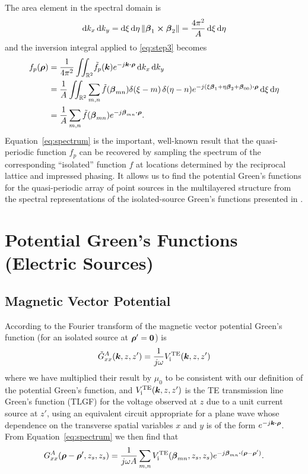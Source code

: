 The area element in the spectral domain is 
\begin{equation}
  \text{d} k_x \, \text{d} k_y = \text{d} \xi \, \text{d} \eta \left\lVert\boldsymbol{\beta}_1 \boldsymbol{\times}
  \boldsymbol{\beta}_2\right\rVert = \frac{4\pi^2}{A} \, \text{d} \xi \, \text{d} \eta
\end{equation}
and the inversion integral applied to \eqref{eq:step3} becomes
\begin{align}
  f_p(\boldsymbol{\rho}) 
  &= \frac{1}{4\pi^2} \iint_{\mathbb{R}^2} \! \tilde{f}_p(\boldsymbol{k}) e^{-j\boldsymbol{k} \boldsymbol{\cdot}
    \boldsymbol{\rho}} \,  \text{d} k_x \, \text{d} k_y \nonumber \\
  &= \frac{1}{A} \iint_{\mathbb{R}^2}
  \sum_{m,n} 
  \tilde{f}(\boldsymbol{\beta}_{mn})  
  \delta(\xi - m) \, \delta(\eta-n)
  e^{-j(\xi\boldsymbol{\beta}_1 + \eta\boldsymbol{\beta}_2 + \boldsymbol{\beta}_{00}) 
    \boldsymbol{\cdot} \boldsymbol{\rho}} \, \text{d} \xi \, \text{d} \eta \nonumber \\
  &= \frac{1}{A}   \sum_{m,n} 
  \tilde{f}(\boldsymbol{\beta}_{mn})  e^{-j\boldsymbol{\beta}_{mn} \boldsymbol{\cdot} \boldsymbol{\rho}}.
  \label{eq:spectrum}
\end{align}
Equation~\eqref{eq:spectrum} is the important, well-known result that the
quasi-periodic function $f_p$ can be recovered by sampling the spectrum of
the corresponding ``isolated'' function $f$ at locations determined by
the reciprocal lattice and impressed phasing. It allows us to
find the potential Green's functions for the quasi-periodic array of
point sources in the multilayered structure
from the spectral representations of the isolated-source Green's functions
presented in \cite{mimo:97}. 

\section{Potential Green's Functions (Electric Sources)}

\subsection{Magnetic Vector Potential}
According to \cite{mimo:97} the Fourier transform of the magnetic
vector potential Green's function (for an isolated source at $\boldsymbol{\rho}'
= \boldsymbol{0}$) is
\begin{equation}
  \label{GA}
  \tilde{G}^{A}_{xx}(\boldsymbol{k},z,z') = \frac{1}{j\omega}V_{\text{i}}^{\text{TE}}(\boldsymbol{k},z,z')
\end{equation}
where we have multiplied their result by $\mu_0$ to be consistent with
our definition of the potential Green's function, and $V_{\text{i}}^{\text{TE}}(\boldsymbol{k},z,z')$ is the
TE transmission line Green's function (TLGF) for the voltage observed at
$z$ due to a unit current source at $z'$, using an equivalent circuit
appropriate for a plane wave whose dependence on the transverse spatial
variables $x$ and $y$ is of the form $e^{-j\boldsymbol{k} \boldsymbol{\cdot} \boldsymbol{\rho}}$.
From Equation~\eqref{eq:spectrum} we then find that
\begin{equation}
  \label{eq:GA}
  G^A_{xx}(\boldsymbol{\rho}-\boldsymbol{\rho}',z_s,z_s) = \frac{1}{j\omega A} \sum_{m,n}
  V_{\text{i}}^{\text{TE}}(\boldsymbol{\beta}_{mn},z_s,z_s)   e^{-j\boldsymbol{\beta}_{mn} \boldsymbol{\cdot} (\boldsymbol{\rho}-\boldsymbol{\rho}')}.
\end{equation}


